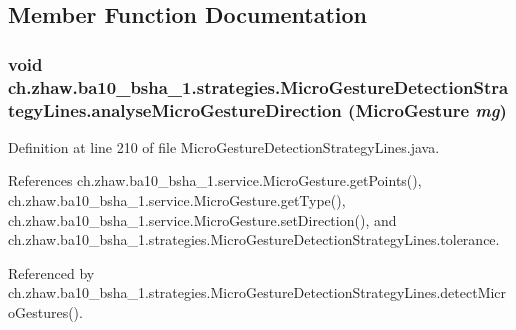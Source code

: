 \subsection{Member Function Documentation}
\hypertarget{classch_1_1zhaw_1_1ba10__bsha__1_1_1strategies_1_1MicroGestureDetectionStrategyLines_ab3ca516ff03d9dc2193d9aaf6afad5e8}{
\subsubsection[{analyseMicroGestureDirection}]{\setlength{\rightskip}{0pt plus 5cm}void ch.zhaw.ba10\_\-bsha\_\-1.strategies.MicroGestureDetectionStrategyLines.analyseMicroGestureDirection ({\bf MicroGesture} {\em mg})}}
\label{classch_1_1zhaw_1_1ba10__bsha__1_1_1strategies_1_1MicroGestureDetectionStrategyLines_ab3ca516ff03d9dc2193d9aaf6afad5e8}


Definition at line 210 of file MicroGestureDetectionStrategyLines.java.

References ch.zhaw.ba10\_\-bsha\_\-1.service.MicroGesture.getPoints(), ch.zhaw.ba10\_\-bsha\_\-1.service.MicroGesture.getType(), ch.zhaw.ba10\_\-bsha\_\-1.service.MicroGesture.setDirection(), and ch.zhaw.ba10\_\-bsha\_\-1.strategies.MicroGestureDetectionStrategyLines.tolerance.

Referenced by ch.zhaw.ba10\_\-bsha\_\-1.strategies.MicroGestureDetectionStrategyLines.detectMicroGestures().

